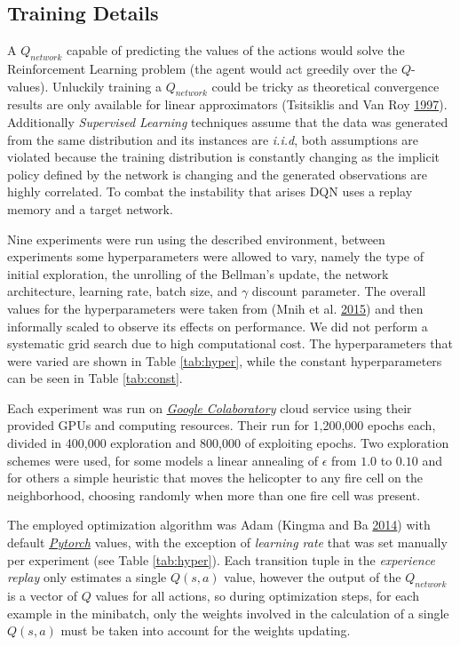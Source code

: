 \documentclass[
  openany]{book}
\begin{document}
\hypertarget{training-details}{%
\subsection{Training Details}\label{training-details}}

A \(Q_{network}\) capable of predicting the values of the actions would solve the Reinforcement Learning problem (the agent would act greedily over the \(Q\)-values). Unluckily training a \(Q_{network}\) could be tricky as theoretical convergence results are only available for linear approximators (Tsitsiklis and Van Roy \protect\hyperlink{ref-tsitsiklis1997analysis}{1997}). Additionally \emph{Supervised Learning} techniques assume that the data was generated from the same distribution and its instances are \emph{i.i.d}, both assumptions are violated because the training distribution is constantly changing as the implicit policy defined by the network is changing and the generated observations are highly correlated. To combat the instability that arises DQN uses a replay memory and a target network.

Nine experiments were run using the described environment, between experiments some hyperparameters were allowed to vary, namely the type of initial exploration, the unrolling of the Bellman's update, the network architecture, learning rate, batch size, and \(\gamma\) discount parameter. The overall values for the hyperparameters were taken from (Mnih et al. \protect\hyperlink{ref-mnih2015human}{2015}) and then informally scaled to observe its effects on performance. We did not perform a systematic grid search due to high computational cost. The hyperparameters that were varied are shown in Table \ref{tab:hyper}, while the constant hyperparameters can be seen in Table \ref{tab:const}.

Each experiment was run on \emph{\href{https://colab.research.google.com}{Google Colaboratory}} cloud service using their provided GPUs and computing resources. Their run for 1,200,000 epochs each, divided in 400,000 exploration and 800,000 of exploiting epochs. Two exploration schemes were used, for some models a linear annealing of \(\epsilon\) from \(1.0\) to \(0.10\) and for others a simple heuristic that moves the helicopter to any fire cell on the neighborhood, choosing randomly when more than one fire cell was present.

The employed optimization algorithm was Adam (Kingma and Ba \protect\hyperlink{ref-kingma2014adam}{2014}) with default \emph{\href{https://pytorch.org/docs/stable/optim.html}{Pytorch}} values, with the exception of \emph{learning rate} that was set manually per experiment (see Table \ref{tab:hyper}). Each transition tuple in the \emph{experience replay} only estimates a single \(Q(s,a)\) value, however the output of the \(Q_{network}\) is a vector of \(Q\) values for all actions, so during optimization steps, for each example in the minibatch, only the weights involved in the calculation of a single \(Q(s,a)\) must be taken into account for the weights updating.
\end{document}
